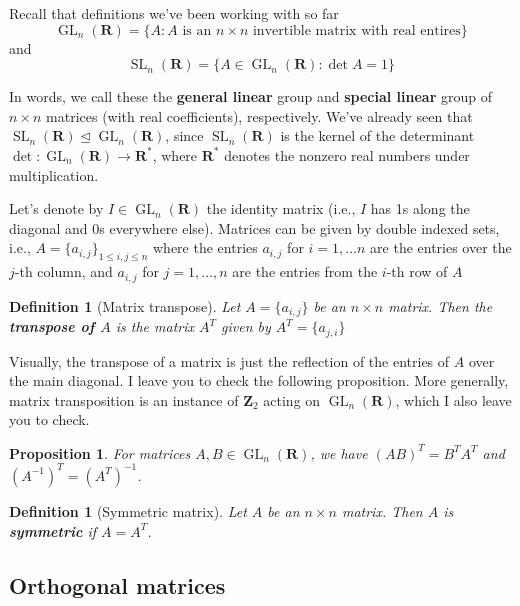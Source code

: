 \documentclass[12pt]{article}
\numberwithin{equation}{subsection}
\newtheorem{prop}[subsection]{Proposition}
\newtheorem{defn}[subsection]{Definition}
\theoremstyle{note}
\newcommand{\GL}{\operatorname{GL}}
\newcommand{\SL}{\operatorname{SL}}
\newcommand{\nrml}{\trianglelefteq}
\begin{document}
Recall that definitions we've been working with so far \begin{equation} \GL_n(\mathbf{R}) = \{A : \text{$A$ is an $n\times n$ invertible matrix with real entires}\}\end{equation} and 
\begin{equation} \SL_n(\mathbf{R}) = \{A\in \GL_n(\mathbf{R}) : \det A=1\}\end{equation}

In words, we call these the \textbf{general linear} group and \textbf{special linear} group of $n\times n$ matrices (with real coefficients), respectively. We've already seen that $\SL_n (\mathbf{R})\nrml \GL_n(\mathbf{R})$, since $\SL_n(\mathbf{R})$ is the kernel of the determinant $\det \colon \GL_n (\mathbf{R})\to\mathbf{R}^{*}$, where $\mathbf{R}^*$ denotes the nonzero real numbers under multiplication. 




Let's denote by $I\in \GL_n(\mathbf{R})$ the identity matrix (i.e., $I$ has 1s along the diagonal and 0s everywhere else). Matrices can be given by double indexed sets, i.e., $A=\{a_{i,j}\}_{1\leq i,j\leq n}$ where the entries $a_{i,j}$ for $i=1,\dots n$ are the entries over the $j$-th column, and $a_{i,j}$ for $j=1,\dots,n$ are the entries from the $i$-th row of $A$

\begin{defn}[Matrix transpose] Let $A=\{a_{i,j}\}$ be an $n\times n$ matrix. Then the \textbf{transpose of $A$} is the matrix $A^T$ given by $A^T=\{a_{j,i}\}$
\end{defn}



Visually, the transpose of a matrix is just the reflection of the entries of $A$ over the main diagonal. I leave you to check the following proposition. More generally, matrix transposition is an instance of $\mathbf{Z}_2$ acting on $\GL_n(\mathbf{R})$, which I also leave you to check. 

\begin{prop} \label{transposition-ex}
	For matrices $A,B\in \GL_n(\mathbf{R})$, we have $(AB)^T=B^TA^T$ and $(A^{-1})^T=(A^T)^{-1}$.
\end{prop}


\begin{defn}[Symmetric matrix]
Let $A$ be an $n\times n$ matrix. Then $A$ is \textbf{symmetric} if $A=A^T$. 
\end{defn}
\subsection{Orthogonal matrices}
\end{document}
